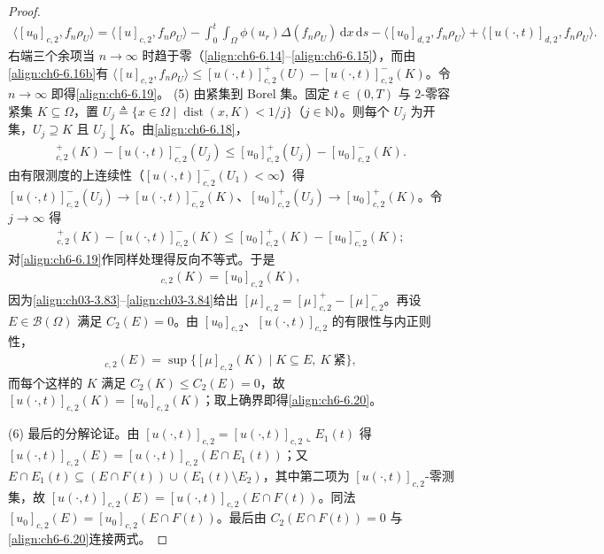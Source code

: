 \documentclass[../../main.tex]{subfiles}%
\begin{document}
\begin{proof}
\begin{align*}
\langle[u_0]_{c,2},f_n\rho_U\rangle
=\langle[u]_{c,2},f_n\rho_U\rangle
-\int_0^t\int_\Omega\phi(u_r)\Delta(f_n\rho_U)\,\mathrm{d}x\,\mathrm{d}s
-\langle[u_0]_{d,2},f_n\rho_U\rangle+\langle[u(\cdot,t)]_{d,2},f_n\rho_U\rangle .
\end{align*}
右端三个余项当 $n\to\infty$ 时趋于零（\eqref{align:ch6-6.14}--\eqref{align:ch6-6.15}），而由\eqref{align:ch6-6.16b}有 $\langle[u]_{c,2},f_n\rho_U\rangle\leqslant[u(\cdot,t)]^+_{c,2}(U)-[u(\cdot,t)]^-_{c,2}(K)$。令 $n\to\infty$ 即得\eqref{align:ch6-6.19}。
(5) 由紧集到 Borel 集。固定 $t\in(0,T)$ 与 $2$-零容紧集 $K\subseteq\Omega$，置 $U_j\triangleq\{x\in\Omega\mid\operatorname{dist}(x,K)<1/j\}$（$j\in\mathbb{N}$）。则每个 $U_j$ 为开集，$U_j\supseteq K$ 且 $U_j\downarrow K$。由\eqref{align:ch6-6.18}，
\begin{align*}
[u(\cdot,t)]^+_{c,2}(K)-[u(\cdot,t)]^-_{c,2}(U_j)
\leqslant[u_0]^+_{c,2}(U_j)-[u_0]^-_{c,2}(K).
\end{align*}
由有限测度的上连续性（$[u(\cdot,t)]^-_{c,2}(U_1)<\infty$）得 $[u(\cdot,t)]^-_{c,2}(U_j)\to[u(\cdot,t)]^-_{c,2}(K)$、$[u_0]^+_{c,2}(U_j)\to[u_0]^+_{c,2}(K)$。令 $j\to\infty$ 得
\begin{align*}
[u(\cdot,t)]^+_{c,2}(K)-[u(\cdot,t)]^-_{c,2}(K)\leqslant[u_0]^+_{c,2}(K)-[u_0]^-_{c,2}(K);
\end{align*}
对\eqref{align:ch6-6.19}作同样处理得反向不等式。于是
\begin{align*}
[u(\cdot,t)]_{c,2}(K)=[u_0]_{c,2}(K),
\end{align*}
因为\eqref{align:ch03-3.83}--\eqref{align:ch03-3.84}给出 $[\mu]_{c,2}=[\mu]^+_{c,2}-[\mu]^-_{c,2}$。再设 $E\in\mathscr{B}(\Omega)$ 满足 $C_2(E)=0$。由 $[u_0]_{c,2}$、$[u(\cdot,t)]_{c,2}$ 的有限性与内正则性，
\begin{align*}
[\mu]_{c,2}(E)=\sup\{[\mu]_{c,2}(K)\mid K\subseteq E,\ K\ \text{紧}\},
\end{align*}
而每个这样的 $K$ 满足 $C_2(K)\leqslant C_2(E)=0$，故 $[u(\cdot,t)]_{c,2}(K)=[u_0]_{c,2}(K)$；取上确界即得\eqref{align:ch6-6.20}。

(6) 最后的分解论证。由 $[u(\cdot,t)]_{c,2}=[u(\cdot,t)]_{c,2}\llcorner E_1(t)$ 得 $[u(\cdot,t)]_{c,2}(E)=[u(\cdot,t)]_{c,2}(E\cap E_1(t))$；又 $E\cap E_1(t)\subseteq(E\cap F(t))\cup(E_1(t)\setminus E_2)$，其中第二项为 $[u(\cdot,t)]_{c,2}$-零测集，故 $[u(\cdot,t)]_{c,2}(E)=[u(\cdot,t)]_{c,2}(E\cap F(t))$。同法 $[u_0]_{c,2}(E)=[u_0]_{c,2}(E\cap F(t))$。最后由 $C_2(E\cap F(t))=0$ 与\eqref{align:ch6-6.20}连接两式。
\end{proof}
\end{document}
